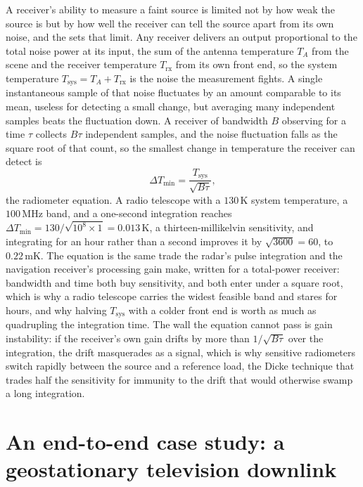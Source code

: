 \begin{mastery}
A receiver's ability to measure a faint source is limited not by how weak
the source is but by how well the receiver can tell the source apart from
its own noise, and the  sets that limit. Any
receiver delivers an output proportional to the total noise power at its
input, the sum of the antenna temperature $T_A$ from the scene and the
receiver temperature $T_{\text{rx}}$ from its own front end, so the system
temperature $T_{\text{sys}} = T_A + T_{\text{rx}}$ is the noise the
measurement fights. A single instantaneous sample of that noise fluctuates
by an amount comparable to its mean, useless for detecting a small change,
but averaging many independent samples beats the fluctuation down. A
receiver of bandwidth $B$ observing for a time $\tau$ collects $B\tau$
independent samples, and the noise fluctuation falls as the square root of
that count, so the smallest change in temperature the receiver can detect
is
\[
\Delta T_{\min} = \frac{T_{\text{sys}}}{\sqrt{B\tau}},
\]
the radiometer equation. A radio telescope with a $130\,\si{\kelvin}$
system temperature, a $100\,\si{\mega\hertz}$ band, and a one-second
integration reaches $\Delta T_{\min} = 130/\sqrt{10^{8}\times 1} =
0.013\,\si{\kelvin}$, a thirteen-millikelvin sensitivity, and integrating
for an hour rather than a second improves it by $\sqrt{3600} = 60$, to
$0.22\,\si{\milli\kelvin}$. The equation is the same trade the radar's
pulse integration and the navigation receiver's processing gain make,
written for a total-power receiver: bandwidth and time both buy
sensitivity, and both enter under a square root, which is why a radio
telescope carries the widest feasible band and stares for hours, and why
halving $T_{\text{sys}}$ with a colder front end is worth as much as
quadrupling the integration time. The wall the equation cannot pass is
gain instability: if the receiver's own gain drifts by more than
$1/\sqrt{B\tau}$ over the integration, the drift masquerades as a signal,
which is why sensitive radiometers switch rapidly between the source and a
reference load, the Dicke technique that trades half the sensitivity for
immunity to the drift that would otherwise swamp a long integration.
\end{mastery}

\section{An end-to-end case study: a geostationary television
downlink}

